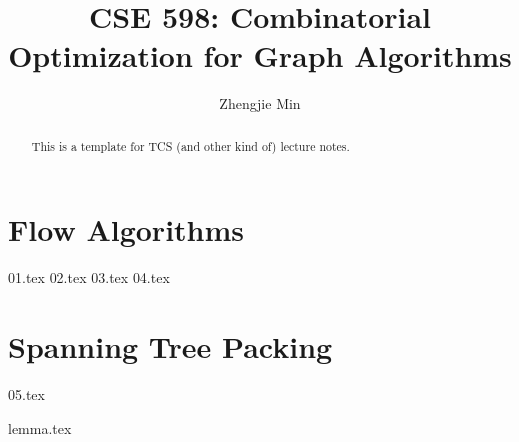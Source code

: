 \documentclass[a4paper]{report}
\author{Zhengjie Min}
\title{CSE 598: Combinatorial Optimization for Graph Algorithms}
\begin{document}
\maketitle

\begin{abstract}
	This is a template for TCS (and other kind of) lecture notes.
\end{abstract}

\newpage

\tableofcontents

\part{Flow Algorithms}

{01.tex}
{02.tex}
{03.tex}
{04.tex}

\part{Spanning Tree Packing}

{05.tex}

\newpage
\appendix
\appendixpage{}

{lemma.tex}
%

\newpage
\pagestyle{plain}
\printbibliography{}
\end{document}
